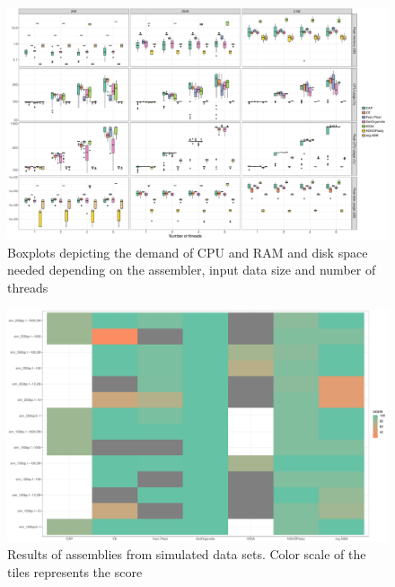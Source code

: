 \documentclass{bmcart}
\begin{document}
\begin{backmatter}
\begin{figure}[h!]
  \includegraphics[width=\textwidth]{plots/usage_amount_threads.pdf}
  \caption{
      Boxplots depicting the demand of CPU and RAM and disk space needed depending on the assembler, input data size and number of threads}
      \label{fig:performance_memory_cpu}
      \end{figure}

\begin{figure}[h!]
  \includegraphics[width=\textwidth]{plots/sim_tiles.pdf}
  \caption{
      Results of assemblies from simulated data sets. Color scale of the tiles represents the score }
      \label{fig:simulated}
      \end{figure}


\end{backmatter}
\end{document}
